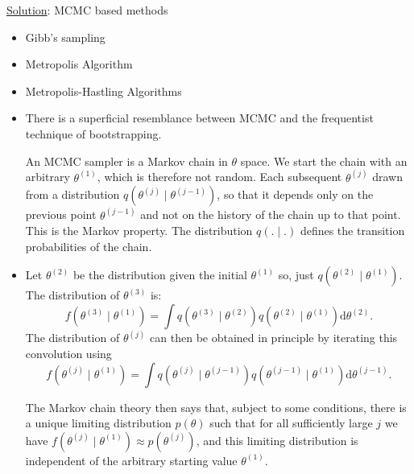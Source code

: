 \documentclass[lecture,12pt,]{pcms-l}
\numberwithin{section}{chapter}
\numberwithin{equation}{chapter}
\theoremstyle{plain}
\theoremstyle{definition}
\theoremstyle{definition}
\begin{document}
\underline{Solution}: MCMC based methods
\begin{itemize}
\item Gibb's sampling
\item Metropolis Algorithm
\item Metropolis-Hastling Algorithms
\end{itemize}
\lecture{}
\begin{itemize}
\item There is a superficial resemblance between MCMC and the frequentist technique of bootstrapping.

An MCMC sampler is a Markov chain in $\theta$ space. We start the chain with an arbitrary $\theta^{(1)}$, which is therefore not random. Each subsequent $\theta^{(j)}$ drawn from a distribution $q(\theta^{(j)} \mid \theta^{(j-1)})$, so that it depends only on the previous point $\theta^{(j-1)}$ and not on the history of the chain up to that point. This is the Markov property. The distribution $q(. \mid .)$ defines the transition probabilities of the chain.
\item Let $\theta^{(2)}$ be the distribution given the initial $\theta^{(1)}$ so, just $q(\theta^{(2)}\mid\theta^{(1)})$. The distribution of $\theta^{(3)}$ is:
\begin{equation}
f( \theta^{(3)} \mid \theta^{(1)})=\int q(\theta^{(3)}\mid\theta^{(2)}) q(\theta^{(2)}\mid\theta^{(1)}) \mathrm{d} \theta^{(2)}.
\end{equation}
The distribution of $\theta^{(j)}$ can then be obtained in principle by iterating this convolution using
 \begin{equation}
f( \theta^{(j)} \mid \theta^{(1)})=\int q(\theta^{(j)}\mid\theta^{(j-1)}) q(\theta^{(j-1)}\mid\theta^{(1)}) \mathrm{d} \theta^{(j-1)}.
\end{equation}

The Markov chain theory then says that, subject to some conditions, there is a unique limiting distribution $p(\theta)$ such that for all sufficiently large $j$ we have $f( \theta^{(j)} \mid \theta^{(1)}) \approx p(\theta^{(j)})$, and this limiting distribution is independent of the arbitrary starting value $\theta^{(1)}$.
\end{itemize}
\end{document}
